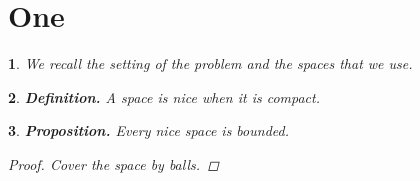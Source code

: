\documentclass{article}
\newtheorem{pkt}{}[section]
\newcommand{\bpk}{\begin{pkt}\rm }
\newcommand{\epk}{\end{pkt}}
\begin{document}
\section{One}
\bpk
We recall the setting of the problem and the spaces that we use.
\epk

\bpk\label{def} {\bf Definition.}
A space is nice when it is compact.
\epk

\bpk \label{prop} {\bf Proposition.} {\em Every nice space is bounded.}
\begin{proof} Cover the space by balls. \end{proof}
\epk
\end{document}
